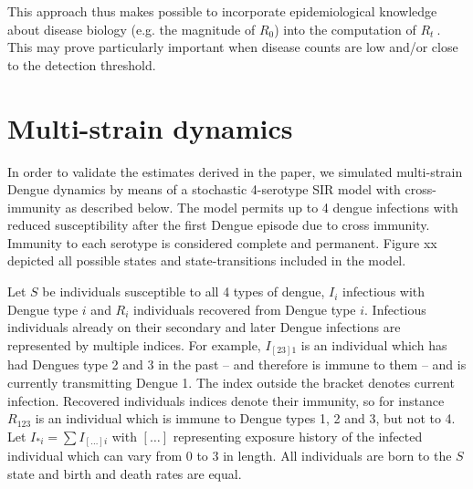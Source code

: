 \documentclass[12pt]{article}
\def \rr {$R_{t}\ $}
\begin{document}
This approach thus makes possible to incorporate epidemiological knowledge 
about disease biology (e.g. the magnitude of $R_0$) into the computation of \rr.
This may prove particularly important when disease counts are low and/or close 
to the detection threshold.
\newpage
\section*{Multi-strain dynamics}

In order to validate the estimates derived in the paper, we simulated 
multi-strain Dengue dynamics by means of a stochastic 4-serotype SIR model with 
cross-immunity as described below. The model permits up to 4 dengue infections 
with reduced susceptibility after the first Dengue episode due to cross 
immunity. Immunity to each serotype is considered complete and permanent. 
Figure xx depicted all possible states and state-transitions included in the 
model.

Let $S$ be individuals susceptible to all 4 types of dengue, $I_i$ infectious 
with Dengue type $i$ and $R_i$ individuals recovered from Dengue type $i$. 
Infectious individuals already on their secondary and later Dengue infections 
are represented by multiple indices. For example, $I_{[23]1}$ is an individual 
which has had Dengues type 2 and 3 in the past -- and therefore is immune to 
them -- and is currently transmitting Dengue 1. The index outside the bracket 
denotes current infection. Recovered individuals indices denote their immunity, 
so for instance $R_{123}$ is an individual which is immune to Dengue types 1, 2 
and 3, but not to 4. Let $I_{*i} = \sum I_{[\ldots]i}$ with $[\ldots]$ 
representing exposure history of the infected individual which can vary from 0 
to 3 in length. All individuals are born to the $S$ state and birth and death 
rates are equal.
\end{document}
